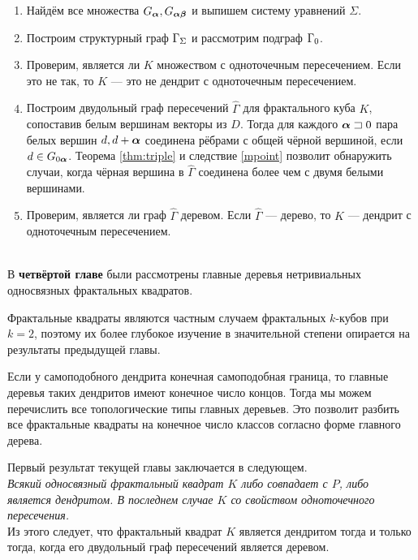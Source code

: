 \begin{enumerate}[nolistsep]
\item Найдём все множества $G_{\bm{\alpha}}, G_{{\bm{\alpha}}{\bm{\beta}}}$ и выпишем систему уравнений $\Sigma$.
\item Построим структурный граф $\Gamma_\Sigma$ и рассмотрим подграф $\Gamma_0$.
\item Проверим, является ли $K$ множеством с одноточечным пересечением.
Если это не так, то $K$ --- это не дендрит с одноточечным пересечением.
\item Построим двудольный граф пересечений $\hat\Gamma$ для фрактального куба $K$, сопоставив белым вершинам векторы из $D$.
Тогда для каждого ${\bm{\alpha}}\sqsupset0$ пара белых вершин $d, d+{\bm{\alpha}}$ соединена рёбрами с общей чёрной вершиной, если $d\in G_{0{\bm{\alpha}}}$.
Теорема \ref{thm:triple} и следствие \ref{mpoint} позволит обнаружить случаи, когда чёрная вершина в $\hat\Gamma$ соединена более чем с двумя белыми вершинами.
\item Проверим, является ли граф $\hat\Gamma$ деревом.
Если $\hat\Gamma$ --- дерево, то $K$ --- дендрит с одноточечным пересечением.
\end{enumerate}\quad\\


В {\bf четвёртой главе} были рассмотрены главные деревья нетривиальных односвязных фрактальных квадратов.

Фрактальные квадраты являются частным случаем фрактальных $k$-кубов при $k=2$, поэтому их более глубокое изучение в значительной степени опирается на результаты предыдущей главы.

Если у самоподобного дендрита конечная самоподобная граница, то главные деревья таких дендритов имеют конечное число концов.
Тогда мы можем перечислить все топологические типы главных деревьев.
Это позволит разбить все фрактальные квадраты на конечное число классов согласно форме главного дерева.

Первый результат текущей главы заключается в следующем.\\

{\em Всякий односвязный фрактальный квадрат $K$ либо совпадает с $P$, либо является дендритом.
В последнем случае $K$ со свойством одноточечного пересечения.}\\

Из этого следует, что фрактальный квадрат $K$ является дендритом тогда и только тогда, когда его двудольный граф пересечений является деревом.\\

